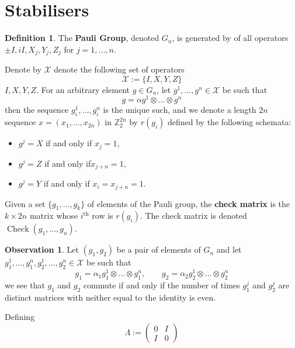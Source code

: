 \documentclass[12pt]{article}
\theoremstyle{plain}
\theoremstyle{definition}
\newtheorem{defn}[thm]{Definition} %
\newtheorem{observation}[thm]{Observation}
\newcommand{\bb}[1]{\mathbb{#1}}
\newcommand{\scr}[1]{\mathscr{#1}}
\begin{document}
	\section{Stabilisers}
	\begin{defn}
		The \textbf{Pauli Group}, denoted $G_n$, is generated by of all operators $\pm I,  i I, X_j, Y_j, Z_j$ for $j = 1,...,n$.
		
		Denote by $\scr{X}$ denote the following set of operators
		\begin{equation}
			\scr{X} := \lbrace I,X,Y,Z\rbrace
		\end{equation} $I,X, Y, Z$.
		For an arbitrary element $g \in G_n$,  let $g^1,...,g^n \in \scr{X}$ be such that
		\begin{equation}\label{eq:canonical_tensor}
			g = \alpha g^1 \otimes \hdots \otimes g^n
		\end{equation}
		then the sequence $g_i^1,...,g_i^n$ is the unique such, and we denote a length $2n$ sequence $x = (x_1,...,x_{2n})$ in $\bb{Z}_2^{2n}$ by $r(g_i)$ defined by the following schemata:
		\begin{itemize}
			\item $g^j = X$ if and only if $x_j = 1$,
			\item $g^j = Z$ if and only if$x_{j + n} = 1$,
			\item $g^j = Y$ if and only if $x_i = x_{j+n} = 1$.
		\end{itemize}
		Given a set $\lbrace g_1,...,g_k\rbrace$ of elements of the Pauli group, the \textbf{check matrix} is the $k \times 2n$ matrix whose $i^\text{th}$ row is $r(g_i)$. The check matrix is denoted $\operatorname{Check}(g_1,...,g_n)$.
	\end{defn}
	\begin{observation}\label{obs:evenness}
		Let $(g_1,g_2)$ be a pair of elements of $G_n$ and let $g_1^1,...,g_1^n, g_2^1,...,g_2^n \in \scr{X}$ be such that
		\begin{equation}
			g_1 = \alpha_1 g_1^1 \otimes \hdots \otimes g_1^n,\qquad g_2 = \alpha_2 g_2^1 \otimes \hdots \otimes g_2^n
		\end{equation}
		we see that $g_1$ and $g_2$ commute if and only if the number of times $g_1^j$ and $g_2^j$ are distinct matrices with neither equal to the identity is even. 
	\end{observation}
	Defining
	\begin{equation}
		\Lambda :=
		\begin{pmatrix}
			0 & I\\
			I & 0
		\end{pmatrix}
	\end{equation}
\end{document}
